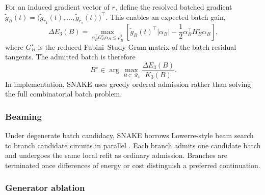 \documentclass[
  reprint,
  amsmath,
  amssymb,
  aps,
  pra,
  nofootinbib,
  superscriptaddress,
  floatfix
]{revtex4-2}
\begin{document}
For an induced gradient vector of $r$, define the resolved batched gradient $\widetilde g_B(t)=\big(\widetilde g_{r_1}(t),\ldots,\widetilde g_{r_s}(t)\big)^\top$. This enables an expected batch gain,
\begin{equation}
\Delta E_3(B)
=
\max_{\alpha_B^\top G_B^\star\alpha_B\le \rho_B^2}
\left[
\widetilde g_B(t)^\top|\alpha_B|
-
\frac12\alpha_B^\top H_B^\star\alpha_B
\right],
\label{eq:batch_expected_gain}
\end{equation}
where $G_B^\star$ is the reduced Fubini--Study Gram matrix of the batch residual tangents. The admitted batch is therefore
\begin{equation}
B^\star\in\arg\max_{B\subseteq\mathcal R_3}\frac{\Delta E_3(B)}{K_3(B)}.
\label{eq:batch_argmax}
\end{equation}
In implementation, SNAKE uses greedy ordered admission rather than solving the full combinatorial batch problem.

\subsubsection{Beaming}

Under degenerate batch candidacy, SNAKE borrows Lowerre-style beam search to branch candidate circuits in parallel \cite{Lowerre1976Beam}. Each branch admits one candidate batch and undergoes the same local refit as ordinary admission. Branches are terminated once differences of energy or cost distinguish a preferred continuation.

\subsubsection{Generator ablation}
\end{document}
